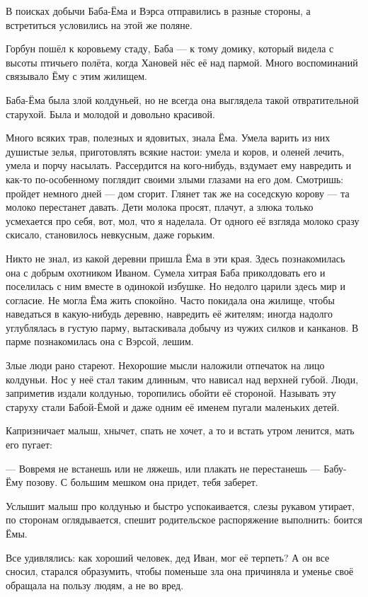 \documentclass[12pt, a4paper, openany]{book}
\begin{document}
	В поисках добычи Баба-Ёма и Вэрса отправились в разные стороны, а встретиться условились на этой же поляне.
	
	Горбун пошёл к коровьему стаду, Баба — к тому домику, который видела с высоты птичьего полёта, когда Хановей нёс её над пармой. Много воспоминаний связывало Ёму с этим жилищем.
	
	Баба-Ёма была злой колдуньей, но не всегда она выглядела такой отвратительной старухой. Была и молодой и довольно красивой.
	
	Много всяких трав, полезных и ядовитых, знала Ёма. Умела варить из них душистые зелья, приготовлять всякие настои: умела и коров, и оленей лечить, умела и порчу насылать. Рассердится на кого-нибудь, вздумает ему навредить и как-то по-особенному поглядит своими злыми глазами на его дом. Смотришь: пройдет немного дней — дом сгорит. Глянет так же на соседскую корову — та молоко перестанет давать. Дети молока просят, плачут, а злюка только усмехается про себя, вот, мол, что я наделала. От одного её взгляда молоко сразу скисало, становилось невкусным, даже горьким.
	
	Никто не знал, из какой деревни пришла Ёма в эти края. Здесь познакомилась она с добрым охотником Иваном. Сумела хитрая Баба приколдовать его и поселилась с ним вместе в одинокой избушке. Но недолго царили здесь мир и согласие. Не могла Ёма жить спокойно. Часто покидала она жилище, чтобы наведаться в какую-нибудь деревню, навредить её жителям; иногда надолго углублялась в густую парму, вытаскивала добычу из чужих силков и канканов. В парме познакомилась она с Вэрсой, лешим.
	
	Злые люди рано стареют. Нехорошие мысли наложили отпечаток на лицо колдуньи. Нос у неё стал таким длинным, что нависал над верхней губой. Люди, заприметив издали колдунью, торопились обойти её стороной. Называть эту старуху стали Бабой-Ёмой и даже одним её именем пугали маленьких детей.
	
	Капризничает малыш, хнычет, спать не хочет, а то и встать утром ленится, мать его пугает:
	
	— Вовремя не встанешь или не ляжешь, или плакать не перестанешь — Бабу-Ёму позову. С большим мешком она придет, тебя заберет.
	
	Услышит малыш про колдунью и быстро успокаивается, слезы рукавом утирает, по сторонам оглядывается, спешит родительское распоряжение выполнить: боится Ёмы.
	
	Все удивлялись: как хороший человек, дед Иван, мог её терпеть? А он все сносил, старался образумить, чтобы поменьше зла она причиняла и уменье своё обращала на пользу людям, а не во вред.
	
\end{document}
